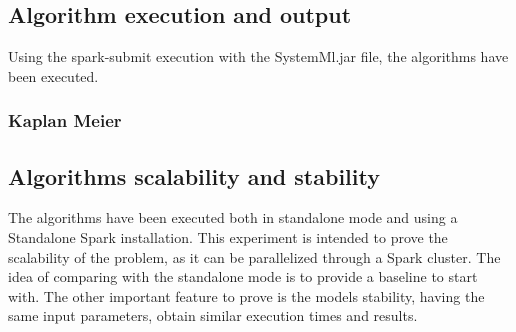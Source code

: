 \documentclass[11pt]{book} %
\begin{document}
      \begin{table}[!ht]
        \centering
        \caption{Correlation matrix}
        \label{tab:correlation_matrix}
      \end{table}

    \subsection{Algorithm execution and output}

      Using the spark-submit execution with the SystemMl.jar file, the algorithms have been executed.

      \subsubsection{Kaplan Meier}

        

    \subsection{Algorithms scalability and stability}

      The algorithms have been executed both in standalone mode and using a Standalone Spark installation. This experiment is intended to prove the scalability of the problem, as it can be parallelized through a Spark cluster. The idea of comparing with the standalone mode is to provide a baseline to start with. The other important feature to prove is the models stability, having the same input parameters, obtain similar execution times and results.
\end{document}
